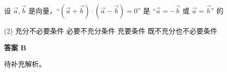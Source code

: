 \begin{choice}[source={2024年北京卷选择题\#5}, topic={向量数量积与条件}]
设 $\vec{a},\vec{b}$ 是向量，``$(\vec{a}+\vec{b})\cdot(\vec{a}-\vec{b})=0$'' 是 ``$\vec{a}=-\vec{b}$ 或 $\vec{a}=\vec{b}$'' 的
\begin{tasks}(2)
	\task 充分不必要条件
	\task 必要不充分条件
	\task 充要条件
	\task 既不充分也不必要条件
\end{tasks}
\end{choice}
\begin{choice-sol}
\textbf{答案 B}

待补充解析。
\end{choice-sol}
